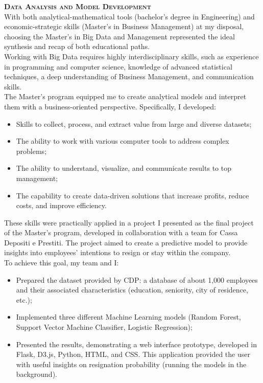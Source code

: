 \is
\textbf{\textsc{Data Analysis and Model Development}} \\
With both analytical-mathematical tools (bachelor's degree in Engineering) and economic-strategic skills (Master’s in Business Management) at my disposal, choosing the Master’s in Big Data and Management represented the ideal synthesis and recap of both educational paths. \\
Working with Big Data requires highly interdisciplinary skills, such as experience in programming and computer science, knowledge of advanced statistical techniques, a deep understanding of Business Management, and communication skills. \\
The Master’s program equipped me to create analytical models and interpret them with a business-oriented perspective. Specifically, I developed:
\begin{itemize}
    \item Skills to collect, process, and extract value from large and diverse datasets;
    \item The ability to work with various computer tools to address complex problems;
    \item The ability to understand, visualize, and communicate results to top management;
    \item The capability to create data-driven solutions that increase profits, reduce costs, and improve efficiency.
\end{itemize}
These skills were practically applied in a project I presented as the final project of the Master’s program, developed in collaboration with a team for Cassa Depositi e Prestiti. The project aimed to create a predictive model to provide insights into employees' intentions to resign or stay within the company. \\
To achieve this goal, my team and I:
\begin{itemize}
    \item Prepared the dataset provided by CDP: a database of about 1,000 employees and their associated characteristics (education, seniority, city of residence, etc.);
    \item Implemented three different Machine Learning models (Random Forest, Support Vector Machine Classifier, Logistic Regression);
    \item Presented the results, demonstrating a web interface prototype, developed in Flask, D3.js, Python, HTML, and CSS. This application provided the user with useful insights on resignation probability (running the models in the background).
\end{itemize}

